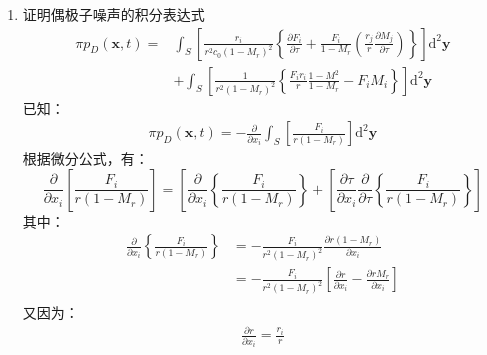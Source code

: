 \begin{enumerate}
    \item 证明偶极子噪声的积分表达式
        \begin{equation*}
            \begin{aligned}
                \pi p_{D}(\mathbf{x}, t)
                =& \int_{S}\left[\frac{r_{i}}{r^{2} c_{0}\left(1-M_{r}\right)^{2}}\left\{\frac{\partial F_{i}}{\partial \tau}+\frac{F_{i}}{1-M_{r}}\left(\frac{r_{j}}{r} \frac{\partial M_{j}}{\partial \tau}\right)\right\}\right] \mathrm{d}^{2} \mathbf{y} \\
                &+\int_{S}\left[\frac{1}{r^{2}\left(1-M_{r}\right)^{2}}\left\{\frac{F_{i} r_{i}}{r} \frac{1-M^{2}}{1-M_{r}}-F_{i} M_{i}\right\}\right] \mathrm{d}^{2} \mathbf{y}
            \end{aligned}
        \end{equation*}
    已知：
    \begin{equation}
        \begin{aligned}
            \pi p_{D}(\mathbf{x}, t)
            = -\frac{\partial}{\partial x_{i}} \int_{S}\left[\frac{F_{i}}{r\left(1-M_{r}\right)}\right] \mathrm{d}^{2} \mathbf{y}
        \end{aligned}
    \end{equation}
    根据微分公式，有：
    \begin{equation}
        \frac{\partial}{\partial x_{i}} \left[\frac{F_{i}}{r\left(1-M_{r}\right)}\right]
        = \left[\frac{\partial}{\partial x_{i}}\left\{\frac{F_{i}}{r\left(1-M_{r}\right)}\right\}+\left[\frac{\partial \tau}{\partial x_{i}}\right.\right.  \left.\frac{\partial}{\partial \tau}\left\{\frac{F_{i}}{r\left(1-M_{r}\right)}\right\}\right]
    \end{equation}
    其中：
    \begin{equation}
        \begin{aligned}
            \frac{\partial}{\partial x_{i}}\left\{\frac{F_{i}}{r\left(1-M_{r}\right)}\right\}
            &= - \frac{F_{i}}{r^{2}\left(1-M_{r}\right)^{2}} \frac{\partial r\left(1-M_{r}\right)}{\partial x_{i}} \\
            &= - \frac{F_{i}}{r^{2}\left(1-M_{r}\right)^{2}} \left[ \frac{\partial r }{\partial x_{i}} - \frac{\partial rM_{r}}{\partial x_{i}} \right] \\
        \end{aligned}
    \end{equation}
    又因为：
    \begin{gather}
        \frac{\partial r }{\partial x_{i}} = \frac{r_{i}}{r} \\

\end{gather}
\end{enumerate}
